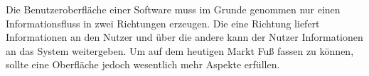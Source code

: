 Die Benutzeroberfläche einer Software muss im Grunde genommen nur einen Informationsfluss in zwei Richtungen erzeugen. Die eine Richtung liefert Informationen an den Nutzer und über die andere kann der Nutzer Informationen an das System weitergeben. Um auf dem heutigen Markt Fuß fassen zu können, sollte eine Oberfläche jedoch wesentlich mehr Aspekte erfüllen. 


